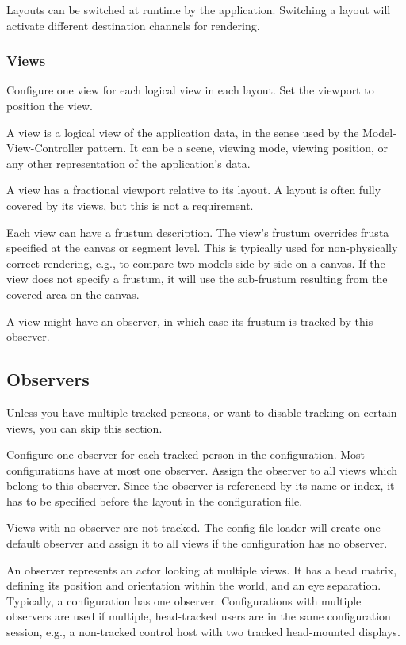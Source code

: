 \documentclass[10pt,a4]{scrartcl}
\begin{document}
Layouts can be switched at runtime by the application. Switching a
layout will activate different destination channels for rendering.

\subsubsection{Views}

Configure one \textsf{view} for each logical view in each layout. Set
the \textsf{viewport} to position the view.

A view is a logical view of the application data, in the sense used by
the Model-View-Controller pattern. It can be a scene, viewing mode,
viewing position, or any other representation of the application's data.

A view has a fractional viewport relative to its layout.  A layout
is often fully covered by its views, but this is not a requirement.

Each view can have a frustum description. The view's frustum overrides
frusta specified at the canvas or segment level. This is typically used
for non-physically correct rendering, e.g., to compare two models
side-by-side on a canvas. If the view does not specify a frustum, it
will use the sub-frustum resulting from the covered area on the canvas.

A view might have an observer, in which case its frustum is tracked by
this observer. 

\subsection{Observers}

Unless you have multiple tracked persons, or want to disable tracking on
certain views, you can skip this section.

Configure one \textsf{observer} for each tracked person in the
configuration. Most configurations have at most one observer. Assign the
observer to all views which belong to this observer. Since the observer
is referenced by its name or index, it has to be specified before the
layout in the configuration file.

Views with no observer are not tracked. The config file loader will
create one default observer and assign it to all views if the
configuration has no observer.

An observer represents an actor looking at multiple views. It has a head
matrix, defining its position and orientation within the world, and an
eye separation. Typically, a configuration has one
observer. Configurations with multiple observers are used if multiple,
head-tracked users are in the same configuration session, e.g., a
non-tracked control host with two tracked head-mounted displays.
\end{document}
